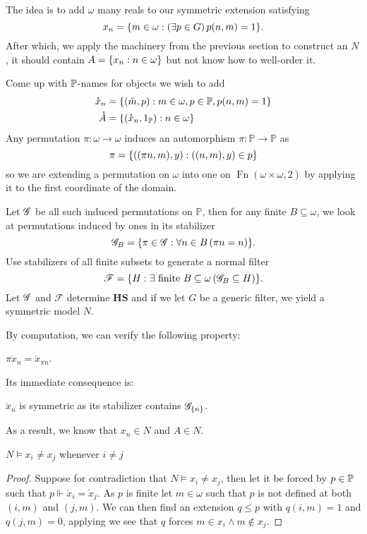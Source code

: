 The idea is to add \(\omega\) many reals to our symmetric extension satisfying
\begin{equation} \label{basicCohen:property_x_n}
    x_n = \set{m\in\omega: \left(\exists p\in G\right) p(n,m) = 1}.
\end{equation}
After which, we apply the machinery from the previous section to construct an \(N\),
it should contain \( A = \set{x_n:n\in \omega } \) but not know how to well-order it.

Come up with \(\P\)-names for objects we wish to add
\begin{align*}
    \mathring{x}_n &= \set{(\check{m},p): m\in\omega, p\in\P,p(n,m) = 1} \\
    \mathring{A} &= \set{(\mathring{x}_n,1_\P): n\in\omega}
\end{align*}
Any permutation \(\pi: \omega \to \omega\) induces an automorphism \(\pi: \mathbb{P}\to\mathbb{P}\) as
\[ \pi = \set{((\pi n, m), y): ((n,m),y) \in p} \]
so we are extending a permutation on \(\omega\) into one on \(\operatorname{Fn}(\omega\times\omega, 2)\)
by applying it to the first coordinate of the domain.

Let \(\G\) be all such induced permutations on \(\mathbb{P}\), then for any finite \(B\subseteq \omega\),
we look at permutations induced by ones in its stabilizer
\[ \G_B = \set{ \pi\in \G: \forall n\in B\left( \pi n = n \right) }. \]
Use stabilizers of all finite subsets to generate a normal filter
\[ \mathscr{F} = \set{H: \exists \text{ finite } B\subseteq \omega \left(\G_B \subseteq H\right) }. \]
Let \(\G\) and \(\mathscr{F}\) determine \(\mathbf{HS}\) and if we let \(G\) be a generic filter, we yield a symmetric model \(N\).

By computation, we can verify the following property:
\begin{proposition}
    \(\pi \mathring{x}_n = \mathring{x}_{\pi n} \).
\end{proposition}
Its immediate consequence is:
\begin{corollary}
    \(\mathring{x}_n\) is symmetric as its stabilizer contains \(\G_\set{n}\).
\end{corollary}
As a result, we know that \(x_n\in N\) and \(A\in N\).

\begin{lemma}
    \(N\models x_i\ne x_j\) whenever \(i\ne j\)
\end{lemma}
\begin{proof}
    Suppose for contradiction that \(N\models x_i\ne x_j\),
    then let it be forced by \(p\in \P\) such that \(p\Vdash \mathring{x}_i = \mathring{x}_j\).
    As \(p\) is finite let \(m\in\omega\) such that \(p\) is not defined at both \((i,m)\) and \((j,m)\).
    We can then find an extension \(q\leq p\) with \(q(i,m) = 1\) and \(q(j,m) = 0\),
    applying 
    we see that \(q\) forces \(m\in x_i \land m\notin x_j\).
\end{proof}

